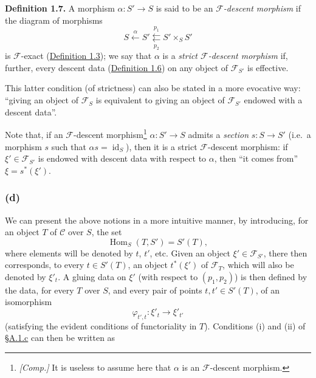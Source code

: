 \documentclass{article}
\newenvironment{rmenv}[1]
  {\phantomsection\par\smallskip\noindent\textbf{#1.}\rmfamily}
  {\par\smallskip}
\theoremstyle{definition}
\theoremstyle{definition}
\theoremstyle{definition}
\theoremstyle{definition}
\theoremstyle{remark}
\begin{document}
\leavevmode{}%
\begin{rmenv}{Definition 1.7}
A morphism \(\alpha\colon S'\to S\) is said to be an \emph{\({\mathcal{F}}\)-descent morphism} if the diagram of morphisms
\[
  S \xleftarrow{\alpha}
  S' \overset{p_1}{\underset{p_2}{\leftleftarrows}}
  S'\times_S S'
\]
is \({\mathcal{F}}\)-exact (\protect\hyperlink{fga-3-i-section-A.1-definition-1.3}{Definition 1.3});
we say that \(\alpha\) is a \emph{strict \({\mathcal{F}}\)-descent morphism} if, further, every descent data (\protect\hyperlink{fga-3-i-section-A.1-definition-1.6}{Definition 1.6}) on any object of \({\mathcal{F}}_{S'}\) is effective.

This latter condition (of strictness) can also be stated in a more evocative way:
``giving an object of \({\mathcal{F}}_S\) is equivalent to giving an object of \({\mathcal{F}}_{S'}\) endowed with a descent data''.

\end{rmenv}

Note that, if an \({\mathcal{F}}\)-descent morphism\footnote{\emph{{[}Comp.{]}} It is useless to assume here that \(\alpha\) is an \({\mathcal{F}}\)-descent morphism.} \(\alpha\colon S'\to S\) admits a \emph{section} \(s\colon S\to S'\) (i.e.~a morphism \(s\) such that \(\alpha s=\operatorname{id}_S\)), then it is a strict \({\mathcal{F}}\)-descent morphism:
if \(\xi'\in{\mathcal{F}}_{S'}\) is endowed with descent data with respect to \(\alpha\), then ``it comes from'' \(\xi=s^*(\xi')\).

\hypertarget{fga-3-i-section-A.1.d}{%
\subsubsection{(d)}\label{fga-3-i-section-A.1.d}}

We can present the above notions in a more intuitive manner, by introducing, for an object \(T\) of \({\mathcal{C}}\) over \(S\), the set
\[
  \operatorname{Hom}_S(T,S') = S'(T),
\]
where elements will be denoted by \(t\), \(t'\), etc.
Given an object \(\xi'\in{\mathcal{F}}_{S'}\), there then corresponds, to every \(t\in S'(T)\), an object \(t^*(\xi')\) of \({\mathcal{F}}_T\), which will also be denoted by \(\xi'_t\).
A gluing data on \(\xi'\) (with respect to \((p_1,p_2)\)) is then defined by the data, for every \(T\) over \(S\), and every pair of points \(t,t'\in S'(T)\), of an isomorphism
\[
  \varphi_{t',t}\colon \xi'_t \to \xi'_{t'}
\]
(satisfying the evident conditions of functoriality in \(T\)).
Conditions (i) and (ii) of \protect\hyperlink{fga-3-i-section-A.1.c}{§A.1.c} can then be written as
\end{document}
